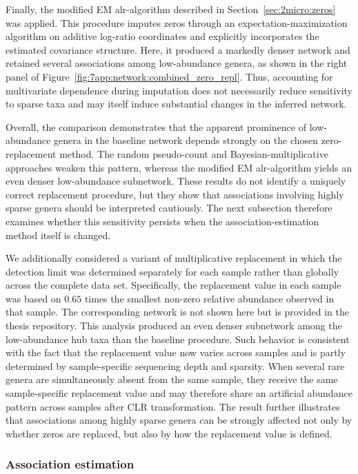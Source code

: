 Finally, the modified EM alr-algorithm described in Section~\ref{sec:2micro:zeros} was applied. This procedure imputes zeros through an expectation-maximization algorithm on additive log-ratio coordinates and explicitly incorporates the estimated covariance structure. Here, it produced a markedly denser network and retained several associations among low-abundance genera, as shown in the right panel of Figure~\ref{fig:7app:network:combined_zero_repl}. Thus, accounting for multivariate dependence during imputation does not necessarily reduce sensitivity to sparse taxa and may itself induce substantial changes in the inferred network.

Overall, the comparison demonstrates that the apparent prominence of low-abundance genera in the baseline network depends strongly on the chosen zero-replacement method. The random pseudo-count and Bayesian-multiplicative approaches weaken this pattern, whereas the modified EM alr-algorithm yields an even denser low-abundance subnetwork. These results do not identify a uniquely correct replacement procedure, but they show that associations involving highly sparse genera should be interpreted cautiously. The next subsection therefore examines whether this sensitivity persists when the association-estimation method itself is changed.


We additionally considered a variant of multiplicative replacement in which the detection limit was determined separately for each sample rather than globally across the complete data set. Specifically, the replacement value in each sample was based on $0.65$ times the smallest non-zero relative abundance observed in that sample. The corresponding network is not shown here but is provided in the thesis repository. This analysis produced an even denser subnetwork among the low-abundance hub taxa than the baseline procedure. Such behavior is consistent with the fact that the replacement value now varies across samples and is partly determined by sample-specific sequencing depth and sparsity. When several rare genera are simultaneously absent from the same sample, they receive the same sample-specific replacement value and may therefore share an artificial abundance pattern across samples after CLR transformation. The result further illustrates that associations among highly sparse genera can be strongly affected not only by whether zeros are replaced, but also by how the replacement value is defined.

\subsubsection{Association estimation}
\label{sec:7app:network:sensitivity:association}

